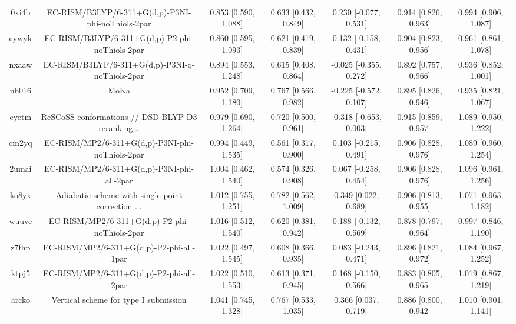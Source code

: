 \documentclass{article}
\begin{document}
\begin{center}
\begin{longtable}{|ccccccc|}
 0xi4b &  EC-RISM/B3LYP/6-311+G(d,p)-P3NI-phi-noThiols-2par &  0.853 [0.590, 1.088] &  0.633 [0.432, 0.849] &   0.230 [-0.077, 0.531] &  0.914 [0.826, 0.963] &   0.994 [0.906, 1.087] \\
 cywyk &    EC-RISM/B3LYP/6-311+G(d,p)-P2-phi-noThiols-2par &  0.860 [0.595, 1.093] &  0.621 [0.419, 0.839] &   0.132 [-0.158, 0.431] &  0.904 [0.823, 0.956] &   0.961 [0.861, 1.078] \\
 nxaaw &    EC-RISM/B3LYP/6-311+G(d,p)-P3NI-q-noThiols-2par &  0.894 [0.553, 1.248] &  0.615 [0.408, 0.864] &  -0.025 [-0.355, 0.272] &  0.892 [0.757, 0.966] &   0.936 [0.852, 1.001] \\
 nb016 &                                               MoKa &  0.952 [0.709, 1.180] &  0.767 [0.566, 0.982] &  -0.225 [-0.572, 0.107] &  0.895 [0.826, 0.946] &   0.935 [0.821, 1.067] \\
 eyetm &  ReSCoSS conformations // DSD-BLYP-D3 reranking... &  0.979 [0.690, 1.264] &  0.720 [0.500, 0.961] &  -0.318 [-0.653, 0.003] &  0.915 [0.859, 0.957] &   1.089 [0.950, 1.222] \\
 cm2yq &    EC-RISM/MP2/6-311+G(d,p)-P3NI-phi-noThiols-2par &  0.994 [0.449, 1.535] &  0.561 [0.317, 0.900] &   0.103 [-0.215, 0.491] &  0.906 [0.828, 0.976] &   1.089 [0.960, 1.254] \\
 2umai &         EC-RISM/MP2/6-311+G(d,p)-P3NI-phi-all-2par &  1.004 [0.462, 1.540] &  0.574 [0.326, 0.908] &   0.067 [-0.258, 0.454] &  0.906 [0.828, 0.976] &   1.096 [0.961, 1.256] \\
 ko8yx &  Adiabatic scheme with single point correction ... &  1.012 [0.755, 1.251] &  0.782 [0.562, 1.009] &    0.349 [0.022, 0.689] &  0.906 [0.813, 0.955] &   1.071 [0.963, 1.182] \\
 wuuvc &      EC-RISM/MP2/6-311+G(d,p)-P2-phi-noThiols-2par &  1.016 [0.512, 1.540] &  0.620 [0.381, 0.942] &   0.188 [-0.132, 0.569] &  0.878 [0.797, 0.964] &   0.997 [0.846, 1.190] \\
 z7fhp &           EC-RISM/MP2/6-311+G(d,p)-P2-phi-all-1par &  1.022 [0.497, 1.545] &  0.608 [0.366, 0.935] &   0.083 [-0.243, 0.471] &  0.896 [0.821, 0.972] &   1.084 [0.967, 1.252] \\
 ktpj5 &           EC-RISM/MP2/6-311+G(d,p)-P2-phi-all-2par &  1.022 [0.510, 1.553] &  0.613 [0.371, 0.945] &   0.168 [-0.150, 0.566] &  0.883 [0.805, 0.965] &   1.019 [0.867, 1.219] \\
 arcko &              Vertical scheme for type I submission &  1.041 [0.745, 1.328] &  0.767 [0.533, 1.035] &    0.366 [0.037, 0.719] &  0.886 [0.800, 0.942] &   1.010 [0.901, 1.141] \\

\end{longtable}
\end{center}
\end{document}
